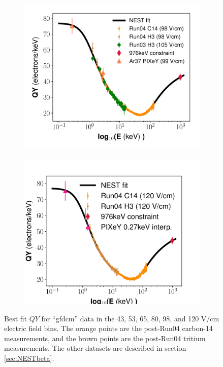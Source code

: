 \begin{figure}[h!]
\begin{subfigure}{0.5\textwidth}
  \centering
  \includegraphics[width=\textwidth]{Figures/Yields_fit_old/NEST_fit_98Vcm_old.pdf}
  \caption{}
\end{subfigure}%
\begin{subfigure}{0.5\textwidth}
  \centering
  \includegraphics[width=\textwidth]{Figures/Yields_fit_old/NEST_fit_120Vcm_old.pdf}
  \caption{}
\end{subfigure}
\caption{Best fit $QY$ for ``gfdcm'' data in the 43, 53, 65, 80, 98, and 120 V/cm electric field bins. The orange points are the post-Run04 carbon-14 measurements, and the brown points are the post-Run04 tritium measurements. The other datasets are described in section \ref{sec:NESTbeta}.}
\label{fig:gfdcm_prelim_QY1}
\end{figure}

